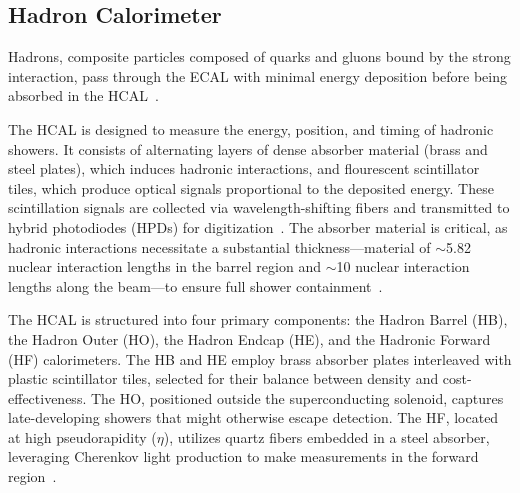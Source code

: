 

\subsection{Hadron Calorimeter}

Hadrons, composite particles composed of quarks and gluons bound by the strong interaction, pass through the ECAL with minimal energy deposition before being absorbed in the HCAL~\cite{CERN-LHCC-97-031, Mans:1481837}. 

The HCAL is designed to measure the energy, position, and timing of hadronic showers. It consists of alternating layers of dense absorber material (brass and steel plates), which induces hadronic interactions, and flourescent scintillator tiles, which produce optical signals proportional to the deposited energy. These scintillation signals are collected via wavelength-shifting fibers and transmitted to hybrid photodiodes (HPDs) for digitization~\cite{CERN-LHCC-97-031, Mans:1481837}. The absorber material is critical, as hadronic interactions necessitate a substantial thickness---material of $\sim$5.82 nuclear interaction lengths in the barrel region and $\sim$10 nuclear interaction lengths along the beam---to ensure full shower containment~\cite{CERN-LHCC-97-031, Mans:1481837}.

The HCAL is structured into four primary components: the Hadron Barrel (HB), the Hadron Outer (HO), the Hadron Endcap (HE), and the Hadronic Forward (HF) calorimeters. The HB and HE employ brass absorber plates interleaved with plastic scintillator tiles, selected for their balance between density and cost-effectiveness. The HO, positioned outside the superconducting solenoid, captures late-developing showers that might otherwise escape detection. The HF, located at high pseudorapidity (\(\eta\)), utilizes quartz fibers embedded in a steel absorber, leveraging Cherenkov light production to make measurements in the forward region~\cite{CMS-HCAL-Performance}.

